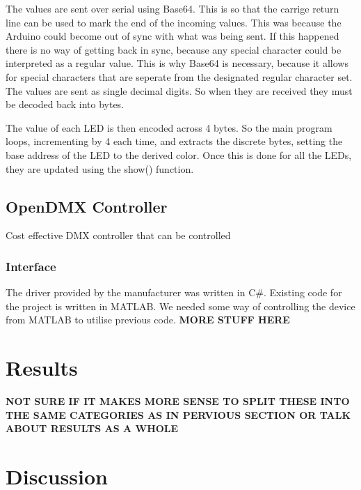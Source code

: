 The values are sent over serial using Base64.
This is so that the carrige return line can be used to mark the end of the incoming values.
This was because the Arduino could become out of sync with what was being sent.
If this happened there is no way of getting back in sync,
because any special character could be interpreted as a regular value.
This is why Base64 is necessary, because it allows for special characters that are seperate
from the designated regular character set.
The values are sent as single decimal digits.
So when they are received they must be decoded back into bytes.

The value of each LED is then encoded across 4 bytes.
So the main program loops, incrementing by 4 each time,
and extracts the discrete bytes, setting the base address of the LED to the derived color.
Once this is done for all the LEDs, they are updated using the show() function.

\subsection{OpenDMX Controller}
Cost effective DMX controller that can be controlled

\subsubsection{Interface}
The driver provided by the manufacturer was written in C\#.
Existing code for the project is written in MATLAB.
We needed some way of controlling the device from MATLAB to utilise previous code.
\textbf{MORE STUFF HERE}

\section{Results}
\textbf{NOT SURE IF IT MAKES MORE SENSE TO SPLIT THESE INTO THE SAME CATEGORIES
  AS IN PERVIOUS SECTION OR TALK ABOUT RESULTS AS A WHOLE}

\section{Discussion}

